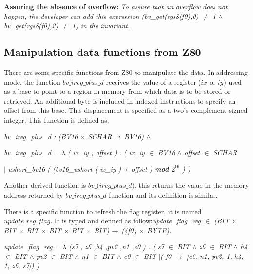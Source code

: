\documentclass[a4paper]{llncs}
\begin{document}
\textbf{Assuring the absence of overflow:}
 \emph{To assure that an overflow does not happen, the developer can add this
 expression (\textit{bv\_get(rgs8(f0),0)} $\neq$ 1 $\land$
 \textit{bv\_get(rgs8(f0),2) $\neq$ 1}) in the invariant.
}

\subsection{Manipulation data functions from Z80}

 There are some specific functions from Z80 to manipulate the data. In addressing mode, the function
$\textit{bv\_ireg\_plus\_d}$ receives the value of a register ($\textit{ix}$ or $\textit{iy}$) 
used as a base to point to a region in memory from which data is to be stored or retrieved.
 An additional byte is included in indexed instructions to specify an offset from this base. This displacement is specified as a two's complement signed integer. This function is defined as:

\hspace*{0.0in}\it bv\_ireg\_plus\_d \rm : \rm(\it BV16  $\times$  \it SCHAR  $\rightarrow$  \it BV16\rm )  $\land$ 

\hspace*{0.0in}\it bv\_ireg\_plus\_d \rm =  $\lambda$  \rm ( \it ix\_iy \rm , \it offset \rm ) \rm . \rm ( \it ix\_iy  $\in$  \it BV16  $\land$  \it offset  $\in$  \it SCHAR   

\hspace*{0.20in}$\mid$ \it ushort\_bv16 \rm ( \rm (\it bv16\_ushort \rm ( \it ix\_iy \rm ) \rm + \it offset \rm ) 
\textbf{\textit{mod}} $2^{16}$ ) \rm )

Another derived function is  $\textit{bv\_(ireg\_plus\_d)}$, this returns the value in the memory  address
returned by $\textit{bv\_ireg\_plus\_d}$ function and its definition is similar.

There is a specific function to refresh the flag register, it is named $\textit{update\_reg\_flag}$. It is typed and defined as follow:\it update\_flag\_reg \rm $\in$ \rm (\it BIT  $\times$  \it BIT  $\times$  \it BIT  $\times$  \it
BIT $\times$  \it BIT  $\times$  \it BIT\rm) $\rightarrow$  \rm (\rm \{\it f0\rm \}  $\times$  \it BYTE\rm ). 

\it update\_flag\_reg \rm =  $\lambda$  \rm (\it s7 \rm, \it z6 \rm,\it h4 \rm,\it pv2 \rm ,\it n1
\rm ,\it c0 \rm) . 
\rm ( \it s7 $\in$ \it BIT $\land$ \it z6 $\in$ \it BIT $\land$ \it h4 $\in$ \it BIT $\land$ \it pv2 $\in$ \it BIT $\land$ \it n1 $\in$ \it BIT $\land$ \it c0 $\in$ \it BIT \hspace*{0.20in}\rm $\mid$( \it f0  $\mapsto$  \rm \rm [\it c0\rm , \it n1\rm , \it pv2\rm , \rm 1\rm , \it h4\rm , \rm 1\rm , \it z6\rm , \it s7\rm \rm ]\rm ) \rm )
\end{document}
